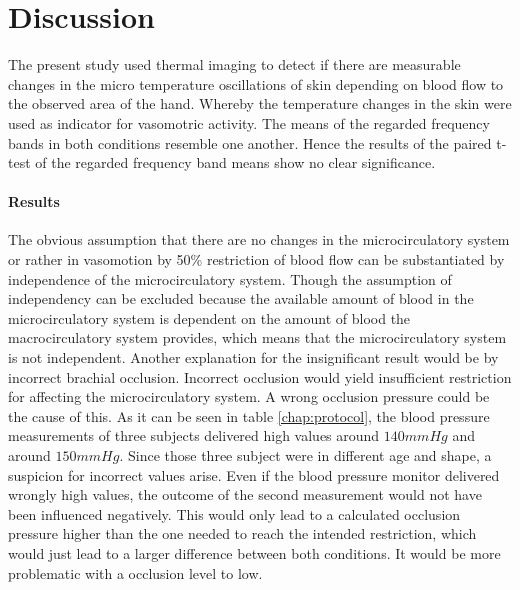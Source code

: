 \chapter{Discussion}

The present study used thermal imaging to detect if there are measurable changes in the micro temperature oscillations of skin depending on blood flow to the observed area of the hand. Whereby the temperature changes in the skin were used as indicator for vasomotric activity. %
The means of the regarded frequency bands in both conditions resemble one another. Hence the results of the paired t-test of the regarded frequency band means show no clear significance.  %

\subsubsection{Results}
The obvious assumption that there are no changes in the microcirculatory system or rather in vasomotion by 50\% restriction of blood flow can be substantiated by independence of the microcirculatory system. Though the assumption of independency can be excluded because the available amount of blood in the microcirculatory system is dependent on the amount of blood the macrocirculatory system provides, which means that the microcirculatory system is not independent. 
Another explanation for the insignificant result would be by incorrect brachial occlusion. Incorrect occlusion would yield insufficient restriction for affecting the microcirculatory system. %
A wrong occlusion pressure could be the cause of this. As it can be seen in table \ref{chap:protocol}, the blood pressure measurements of three subjects delivered high values around $140 mmHg$ and around $150 mmHg$. Since those three subject were in different age and shape, a suspicion for incorrect values arise. %
Even if the blood pressure monitor delivered wrongly high values, the outcome of the second measurement would not have been influenced negatively. This would only lead to a calculated occlusion pressure higher than the one needed to reach the intended restriction, which would just lead to a larger difference between both conditions. It would be more problematic with a occlusion level to low.  %


